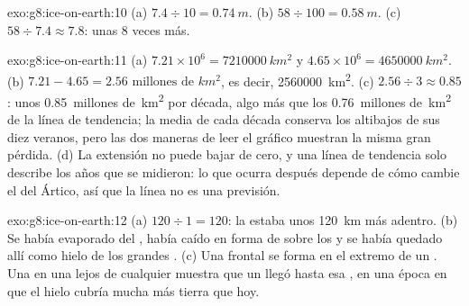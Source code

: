 \begin{solution}{exo:g8:ice-on-earth:10}
(a) $7.4 \div 10 = \qty{0.74}{m}$. (b) $58 \div 100 = \qty{0.58}{m}$.
(c) $58 \div 7.4 \approx 7.8$: unas 8 veces más.
\end{solution}

\begin{solution}{exo:g8:ice-on-earth:11}
(a) $7.21 \times 10^6 = \qty{7210000}{km^2}$ y $4.65 \times 10^6 =
\qty{4650000}{km^2}$. (b) $7.21 - 4.65 = \num{2.56}\text{ millones de }\unit{km^2}$, es
decir, \qty{2560000}{km^2}. (c) $2.56 \div 3 \approx 0.85$: unos
\num{0.85}~millones de~\unit{km^2} por década, algo más que los
\num{0.76}~millones de~\unit{km^2} de la línea de tendencia; la media de
cada década conserva los altibajos de sus diez veranos, pero las dos
maneras de leer el gráfico muestran la misma gran pérdida. (d) La extensión
no puede bajar de cero, y una línea de tendencia solo describe los años que
se midieron: lo que ocurra después depende de cómo cambie el  del
Ártico, así que la línea no es una previsión.
\end{solution}

\begin{solution}{exo:g8:ice-on-earth:12}
(a) $120 \div 1 = 120$: la  estaba unos \qty{120}{km} más  adentro.
(b) Se había evaporado del , había caído en forma de  sobre los
 y se había quedado allí como hielo de los grandes
. (c) Una  frontal se forma en el extremo de un .
Una  en una  lejos de cualquier  muestra que un
 llegó hasta esa , en una época en que el hielo
cubría mucha más tierra que hoy.
\end{solution}


